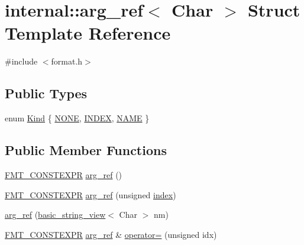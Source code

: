 \hypertarget{structinternal_1_1arg__ref}{}\section{internal\+:\+:arg\+\_\+ref$<$ Char $>$ Struct Template Reference}
\label{structinternal_1_1arg__ref}


{\ttfamily \#include $<$format.\+h$>$}

\subsection*{Public Types}
\begin{DoxyCompactItemize}
\item 
enum \hyperlink{structinternal_1_1arg__ref_a2d07deb839e942cac187aa85bdde30a3}{Kind} \{ \hyperlink{structinternal_1_1arg__ref_a2d07deb839e942cac187aa85bdde30a3a656836910a25903c2e59e78b9acc37f2}{N\+O\+NE}, 
\hyperlink{structinternal_1_1arg__ref_a2d07deb839e942cac187aa85bdde30a3a92ad83db320b40b17166cf9522bf9e66}{I\+N\+D\+EX}, 
\hyperlink{structinternal_1_1arg__ref_a2d07deb839e942cac187aa85bdde30a3acaf0e7180d97213ec0fad9f45cf60d37}{N\+A\+ME}
 \}
\end{DoxyCompactItemize}
\subsection*{Public Member Functions}
\begin{DoxyCompactItemize}
\item 
\hyperlink{core_8h_a69201cb276383873487bf68b4ef8b4cd}{F\+M\+T\+\_\+\+C\+O\+N\+S\+T\+E\+X\+PR} \hyperlink{structinternal_1_1arg__ref_aad3324f04dd0a0211dff2300a926c563}{arg\+\_\+ref} ()
\item 
\hyperlink{core_8h_a69201cb276383873487bf68b4ef8b4cd}{F\+M\+T\+\_\+\+C\+O\+N\+S\+T\+E\+X\+PR} \hyperlink{structinternal_1_1arg__ref_a4cb4d50bfbaa4e9658a192d5c561bac0}{arg\+\_\+ref} (unsigned \hyperlink{structinternal_1_1arg__ref_a888955ce30e4acb797f6a99d2eadb23e}{index})
\item 
\hyperlink{structinternal_1_1arg__ref_a4d9775a065fe0790d2f10f798bb6bd12}{arg\+\_\+ref} (\hyperlink{classbasic__string__view}{basic\+\_\+string\+\_\+view}$<$ Char $>$ nm)
\item 
\hyperlink{core_8h_a69201cb276383873487bf68b4ef8b4cd}{F\+M\+T\+\_\+\+C\+O\+N\+S\+T\+E\+X\+PR} \hyperlink{structinternal_1_1arg__ref}{arg\+\_\+ref} \& \hyperlink{structinternal_1_1arg__ref_a927898d1d25eb9e65d631a9c50cf4f20}{operator=} (unsigned idx)
\end{DoxyCompactItemize}
